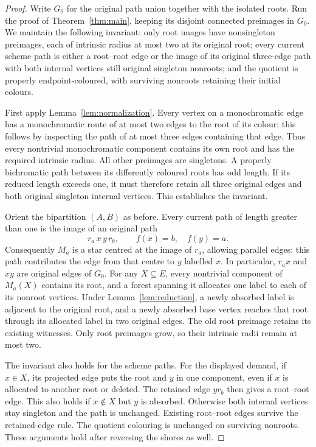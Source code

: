\documentclass[11pt]{amsart}
\begin{document}
\begin{proof}
Write $G_0$ for the original path union together with the isolated roots.
Run the proof of Theorem~\ref{thm:main}, keeping its disjoint connected
preimages in $G_0$. We maintain the following invariant: only root images
have nonsingleton preimages, each of intrinsic radius at most two at its
original root; every current scheme path is either a root--root edge
or the image of its original three-edge path with both internal vertices
still original singleton nonroots; and the quotient is properly
endpoint-coloured, with surviving nonroots retaining their initial colours.

First apply Lemma~\ref{lem:normalization}. Every vertex on a
monochromatic edge has a monochromatic route of at most two edges to
the root of its colour: this follows by inspecting the path of at most
three edges containing that edge. Thus every nontrivial monochromatic
component contains its own root and has the required intrinsic radius.
All other preimages are singletons. A properly bichromatic path between
its differently coloured roots has odd length. If its reduced length
exceeds one, it must therefore retain all three original edges and both
original singleton internal vertices. This establishes the invariant.

Orient the bipartition $(A,B)$ as before. Every current path of length
greater than one is the image of an original path
\[
 r_a\,x\,y\,r_b,\qquad f(x)=b,\quad f(y)=a.
\]
Consequently $M_a$ is a star centred at the image of $r_a$, allowing
parallel edges: this path contributes the edge from that centre to $y$
labelled $x$. In particular, $r_ax$ and $xy$ are original edges of $G_0$.
For any $X\subseteq E$, every nontrivial component of $M_a(X)$ contains
its root, and a forest spanning it allocates one label to each of its
nonroot vertices. Under Lemma~\ref{lem:reduction}, a newly absorbed
label is adjacent to the original root, and a newly absorbed base vertex
reaches that root through its allocated label in two original edges.
The old root preimage retains its existing witnesses. Only root
preimages grow, so their intrinsic radii remain at most two.

The invariant also holds for the scheme paths. For the displayed demand,
if $x\in X$, its projected edge puts the root and $y$ in one component,
even if $x$ is allocated to another root or deleted. The retained edge
$yr_b$ then gives a root--root edge. This also holds if $x\notin X$ but
$y$ is absorbed. Otherwise both internal vertices stay singleton and
the path is unchanged. Existing root--root edges survive the retained-edge
rule. The quotient colouring is unchanged on surviving nonroots.
These arguments hold after reversing the shores as well.


\end{proof}
\end{document}
